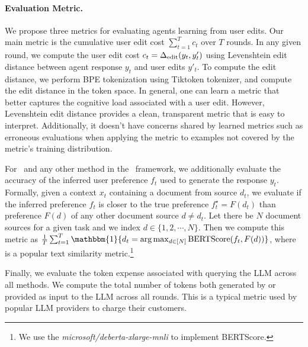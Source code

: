 \paragraph{Evaluation Metric.} We propose three metrics for evaluating agents learning from user edits. Our main metric is the cumulative user edit cost $\sum_{t=1}^T c_t$ over $T$ rounds. In any given round, we compute the user edit cost $c_t = \Delta_{\textrm{edit}}(y_t, y'_t)$ using Levenshtein edit distance between agent response $y_t$ and user edits $y'_t$. To compute the edit distance, we perform BPE tokenization using Tiktoken tokenizer, and compute the edit distance in the token space.
In general, one can learn a metric that better captures the cognitive load associated with a user edit.
However, Levenshtein edit distance provides a clean, transparent metric that is easy to interpret. Additionally, it doesn't have concerns shared by learned metrics such as erroneous evaluations when applying the metric to examples not covered by the metric's training distribution.

For \algname~and any other method in the \framework~framework, we additionally evaluate the accuracy of the inferred user preference $f_t$ used to generate the response $y_t$. Formally, given a context $x_t$ containing a document from source $d_t$, we evaluate if the inferred preference $f_t$ is closer to the true preference $f^\star_t = F(d_t)$ than preference $F(d)$ of any other document source $d \ne d_t$. Let there be $N$ document sources for a given task and we index $d \in \{1, 2, \cdots, N\}$. Then we compute this metric as $\frac{1}{T}\sum_{t=1}^{T} \mathbbm{1}\{d_t = \arg\max_{d \in [N]} \text{BERTScore}(f_t, F(d))\}$, where ~\citep{bert-score} is a popular text similarity metric.\footnote{We use the \textit{microsoft/deberta-xlarge-mnli} to implement BERTScore.}

Finally, we evaluate the token expense associated with querying the LLM across all methods. We compute the total number of tokens both generated by or provided as input to the LLM across all rounds. This is a typical metric used by popular LLM providers to charge their customers.



















